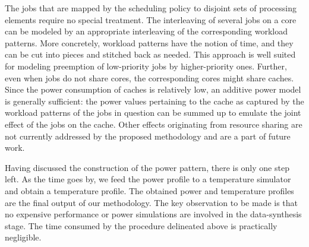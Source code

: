The jobs that are mapped by the scheduling policy to disjoint sets of processing
elements require no special treatment. The interleaving of several jobs on a
core can be modeled by an appropriate interleaving of the corresponding workload
patterns. More concretely, workload patterns have the notion of time, and they
can be cut into pieces and stitched back as needed. This approach is well suited
for modeling preemption of low-priority jobs by higher-priority ones. Further,
even when jobs do not share cores, the corresponding cores might share caches.
Since the power consumption of caches is relatively low, an additive power model
is generally sufficient: the power values pertaining to the cache as captured by
the workload patterns of the jobs in question can be summed up to emulate the
joint effect of the jobs on the cache. Other effects originating from resource
sharing are not currently addressed by the proposed methodology and are a part
of future work.

Having discussed the construction of the power pattern, there is only one step
left. As the time goes by, we feed the power profile to a temperature simulator
and obtain a temperature profile. The obtained power and temperature profiles
are the final output of our methodology. The key observation to be made is that
no expensive performance or power simulations are involved in the data-synthesis
stage. The time consumed by the procedure delineated above is practically
negligible.
